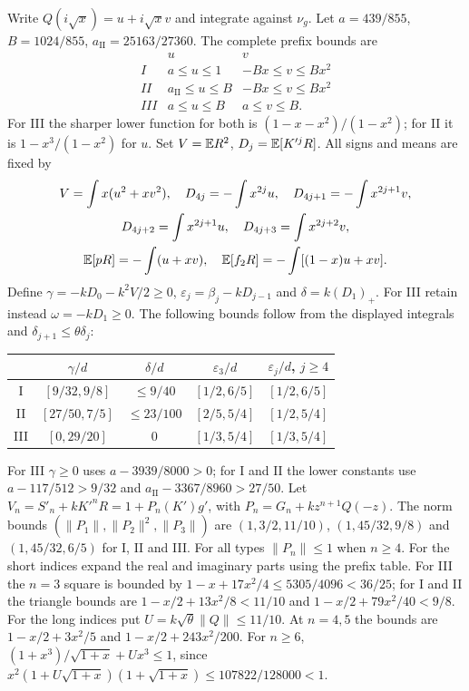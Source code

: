 Write $Q(i\sqrt x)=u+i\sqrt x v$ and integrate against $\nu_g$.
Let $a=439/855$, $B=1024/855$, $a_{\mathrm{II}}=25163/27360$.
The complete prefix bounds are
\[
 \begin{array}{c|cc}
 &u&v\\\hline
 I&a\le u\le1&-Bx\le v\le Bx^2\\
 II&a_{\mathrm{II}}\le u\le B&-Bx\le v\le Bx^2\\
 III&a\le u\le B&a\le v\le B.
 \end{array}
\]
For III the sharper lower function for both is
$(1-x-x^2)/(1-x^2)$; for II it is $1-x^3/(1-x^2)$ for $u$.
Set $V=\mathbb E R^2$, $D_j=\mathbb E[K'^jR]$.
All signs and means are fixed by
\begin{gather*}
 V=\int x(u^2+xv^2),\quad
 D_{4j}=-\int x^{2j}u,\quad D_{4j+1}=-\int x^{2j+1}v,\\
 D_{4j+2}=\int x^{2j+1}u,\quad D_{4j+3}=\int x^{2j+2}v,\\
 \mathbb E[pR]=-\int(u+xv),\quad\mathbb E[f_2R]=-\int[(1-x)u+xv].
\end{gather*}
Define $\gamma=-kD_0-k^2V/2\ge0$,
$\varepsilon_j=\beta_j-kD_{j-1}$ and $\delta=k(D_1)_+$.
For III retain instead $\omega=-kD_1\ge0$.
The following bounds follow from the displayed integrals and
$\delta_{j+1}\le\theta \delta_{j}$:
\begin{center}\small
\begin{tabular}{@{}ccccc@{}}
\toprule
 & $\gamma/d$ & $\delta/d$ & $\varepsilon_3/d$ & $\varepsilon_j/d$, $j\ge4$\\\midrule
I & $[9/32,9/8]$ & $\le9/40$ & $[1/2,6/5]$ & $[1/2,6/5]$\\
II & $[27/50,7/5]$ & $\le23/100$ & $[2/5,5/4]$ & $[1/2,5/4]$\\
III & $[0,29/20]$ & $0$ & $[1/3,5/4]$ & $[1/3,5/4]$\\\bottomrule
\end{tabular}
\end{center}
For III $\gamma\ge0$ uses $a-3939/8000>0$;
for I and II the lower constants use $a-117/512>9/32$ and
$a_{\mathrm{II}}-3367/8960>27/50$.
Let $V_n=S'_n+kK'^nR=1+P_n(K')g'$, with
$P_n=G_n+kz^{n+1}Q(-z)$.
The norm bounds $(\|P_1\|,\|P_2\|^2,\|P_3\|)$ are
$(1,3/2,11/10)$, $(1,45/32,9/8)$ and $(1,45/32,6/5)$
for I, II and III. For all types $\|P_n\|\le1$ when $n\ge4$.
For the short indices expand the real and imaginary parts using the
prefix table. For III the $n=3$ square is bounded by
$1-x+17x^2/4\le5305/4096<36/25$;
for I and II the triangle bounds are
$1-x/2+13x^2/8<11/10$ and $1-x/2+79x^2/40<9/8$.
For the long indices put $U=k\sqrt\theta\|Q\|\le11/10$.
At $n=4,5$ the bounds are $1-x/2+3x^2/5$ and
$1-x/2+243x^2/200$.
For $n\ge6$, $(1+x^3)/\sqrt{1+x}+Ux^3\le1$, since
$x^2(1+U\sqrt{1+x})(1+\sqrt{1+x})\le107822/128000<1$.

